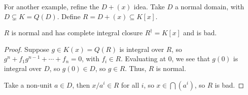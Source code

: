  For another example, refine the $D+(x)$ idea. Take $D$ a normal domain, with
 $D\subsetneq K=Q(D)$. Define $R= D+(x)\subseteq K[x]$.
 \begin{proposition}
   $R$ is normal and has complete integral closure $R^\dag = K[x]$ and is bad.
 \end{proposition}
 \begin{proof}
   Suppose $g\in K(x)=Q(R)$ is integral over $R$, so $g^n+f_1g^{n-1}+\cdots + f_n=0$,
   with $f_i\in R$. Evaluating at 0, we see that $g(0)$ is integral over $D$, so $g(0)\in
   D$, so $g\in R$. Thus, $R$ is normal.

   Take a non-unit $a\in D$, then $x/a^i\in R$ for all $i$, so $x\in \bigcap (a^i)$, so
   $R$ is bad.
 \end{proof}
